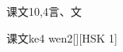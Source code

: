 \begin{entry}{课文}{10,4}{⾔、⽂}
  \begin{phonetics}{课文}{ke4 wen2}[][HSK 1]
  \end{phonetics}
\end{entry}
